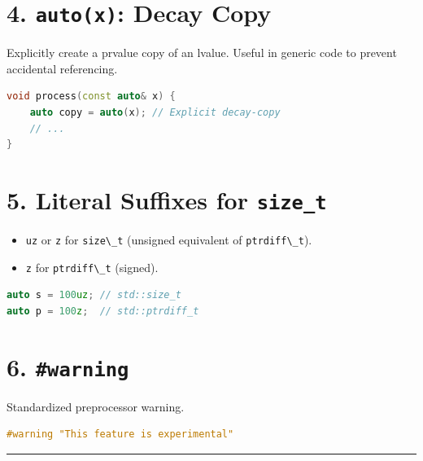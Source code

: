 \hypertarget{autox-decay-copy}{%
\section{\texorpdfstring{4. \texttt{auto(x)}: Decay
Copy}{4. auto(x): Decay Copy}}\label{autox-decay-copy}}

Explicitly create a prvalue copy of an lvalue. Useful in generic code to
prevent accidental referencing.

\begin{lstlisting}[language={C++}]
void process(const auto& x) {
    auto copy = auto(x); // Explicit decay-copy
    // ...
}
\end{lstlisting}

\hypertarget{literal-suffixes-for-size_t}{%
\section{\texorpdfstring{5. Literal Suffixes for
\texttt{size\_t}}{5. Literal Suffixes for size\_t}}\label{literal-suffixes-for-size_t}}

\begin{itemize}
\tightlist
\item
  \passthrough{\lstinline!uz!} or \passthrough{\lstinline!z!} for
  \passthrough{\lstinline!size\_t!} (unsigned equivalent of
  \passthrough{\lstinline!ptrdiff\_t!}).
\item
  \passthrough{\lstinline!z!} for \passthrough{\lstinline!ptrdiff\_t!}
  (signed).
\end{itemize}

\begin{lstlisting}[language={C++}]
auto s = 100uz; // std::size_t
auto p = 100z;  // std::ptrdiff_t
\end{lstlisting}

\hypertarget{warning}{%
\section{\texorpdfstring{6.
\texttt{\#warning}}{6. \#warning}}\label{warning}}

Standardized preprocessor warning.

\begin{lstlisting}[language={C++}]
#warning "This feature is experimental"
\end{lstlisting}

\begin{center}\rule{0.5\linewidth}{0.5pt}\end{center}
